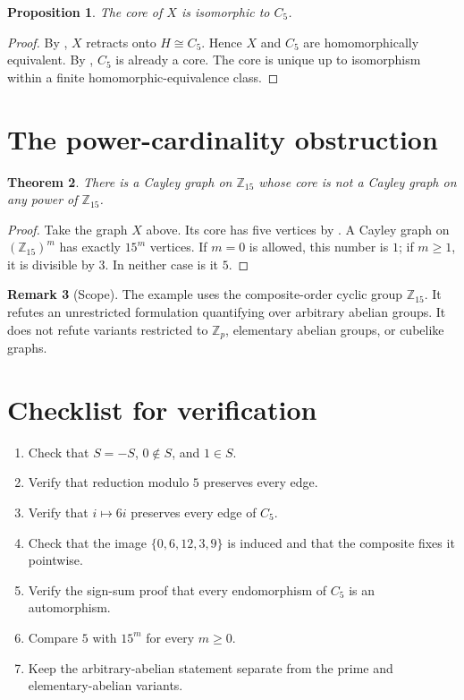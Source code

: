 \documentclass[10pt,reqno]{amsart}
\newtheorem{theorem}{Theorem}[section]
\newtheorem{proposition}[theorem]{Proposition}
\theoremstyle{definition}
\newtheorem{remark}[theorem]{Remark}
\begin{document}
\begin{proposition}\label{prop:core}
The core of \(X\) is isomorphic to \(C_5\).
\end{proposition}

\begin{proof}
By , \(X\) retracts onto \(H\cong C_5\).  Hence \(X\) and
\(C_5\) are homomorphically equivalent.  By , \(C_5\) is
already a core.  The core is unique up to isomorphism within a finite
homomorphic-equivalence class.
\end{proof}

\section{The power-cardinality obstruction}

\begin{theorem}\label{thm:main}
There is a Cayley graph on \(\mathbb Z_{15}\) whose core is not a Cayley
graph on any power of \(\mathbb Z_{15}\).
\end{theorem}

\begin{proof}
Take the graph \(X\) above.  Its core has five vertices by
.  A Cayley graph on \((\mathbb Z_{15})^m\) has exactly
\(15^m\) vertices.  If \(m=0\) is allowed, this number is \(1\); if
\(m\geq1\), it is divisible by \(3\).  In neither case is it \(5\).
\end{proof}

\begin{remark}[Scope]\label{rem:scope}
The example uses the composite-order cyclic group \(\mathbb Z_{15}\).
It refutes an unrestricted formulation quantifying over arbitrary abelian
groups.  It does not refute variants restricted to
\(\mathbb Z_p\), elementary abelian groups, or cubelike graphs.
\end{remark}

\appendix

\section{Checklist for verification}

\begin{enumerate}
  \item Check that \(S=-S\), \(0\notin S\), and \(1\in S\).
  \item Verify that reduction modulo \(5\) preserves every edge.
  \item Verify that \(i\mapsto6i\) preserves every edge of \(C_5\).
  \item Check that the image \(\{0,6,12,3,9\}\) is induced and that the
  composite fixes it pointwise.
  \item Verify the sign-sum proof that every endomorphism of \(C_5\) is an
  automorphism.
  \item Compare \(5\) with \(15^m\) for every \(m\geq0\).
  \item Keep the arbitrary-abelian statement separate from the prime and
  elementary-abelian variants.
\end{enumerate}
\end{document}
